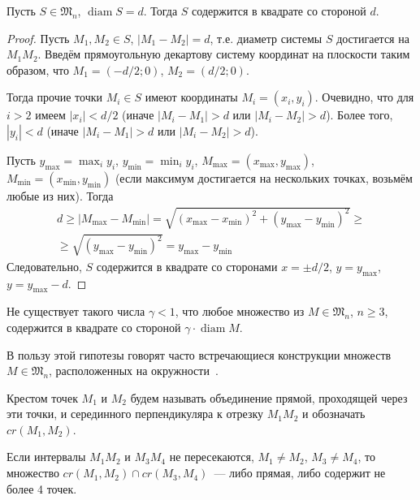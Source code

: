 \begin{lemma}
	\label{lemma:square_container}
	Пусть $S\in\mathfrak{M}_n$, $\operatorname{diam} S = d$.
	Тогда $S$ содержится в квадрате со стороной $d$.
\end{lemma}

\begin{proof}
	Пусть $M_1, M_2 \in S$, $|M_1 - M_2| = d$,
	т.е. диаметр системы $S$ достигается на $M_1 M_2$.
	Введём прямоугольную декартову систему координат на плоскости таким образом, что
	$M_1 = (-d/2; 0)$, $M_2 = (d/2; 0)$.

	Тогда прочие точки $M_i \in S$ имеют координаты $M_i=(x_i, y_i)$.
	Очевидно, что для $i>2$ имеем $|x_i| < d/2$
	(иначе $|M_i - M_1| > d$ или $|M_i - M_2| > d$).
	Более того, $|y_i| < d$ (иначе $|M_i - M_1| > d$ или $|M_i - M_2| > d$).

	Пусть $y_{\max} = \max_{i} y_i$, $y_{\min} = \min_{i} y_i$, $M_{\max}=(x_{\max}, y_{\max})$, $M_{\min}=(x_{\min}, y_{\min})$
	(если максимум достигается на нескольких точках, возьмём любые из них).
	Тогда
	\begin{multline}
		d \geq |M_{\max} - M_{\min}| = \sqrt{(x_{\max} - x_{\min})^2 + (y_{\max} - y_{\min})^2}
		\geq
		\\\geq
		\sqrt{(y_{\max} - y_{\min})^2} =
		y_{\max} - y_{\min}
	\end{multline}
	Следовательно, $S$ содержится в квадрате со сторонами $x=\pm d/2$,
	$y=y_{\max}$, $y=y_{\max} - d$.
\end{proof}

\begin{hypothesis}
	Не существует такого числа $\gamma < 1$,
	что любое множество из $M\in \mathfrak{M}_n$, $n\geq 3$,
	содержится в квадрате со стороной $\gamma \cdot \operatorname{diam} M$.
\end{hypothesis}

В пользу этой гипотезы говорят часто встречающиеся конструкции множеств $M\in\mathfrak{M}_n$,
расположенных на окружности~\cite{anning1915discussions,harborth1993upper,piepmeyer1996maximum,kurz2008bounds,our-vvmsh-2018}.

\begin{definition}
	Крестом точек $M_1$ и $M_2$ будем называть объединение прямой,
	проходящей через эти точки,
	и серединного перпендикуляра к отрезку $M_1 M_2$
	и обозначать $cr(M_1,M_2)$.
\end{definition}

\begin{proposition}
	\label{proposition:intervals_cross}
	Если интервалы $M_1 M_2$ и $M_3 M_4$ не пересекаются,
	$M_1 \neq M_2$, $M_3 \neq M_4$,
	то множество $cr(M_1,M_2) \cap cr(M_3,M_4)$~--- либо прямая, либо содержит не более 4 точек.
\end{proposition}

